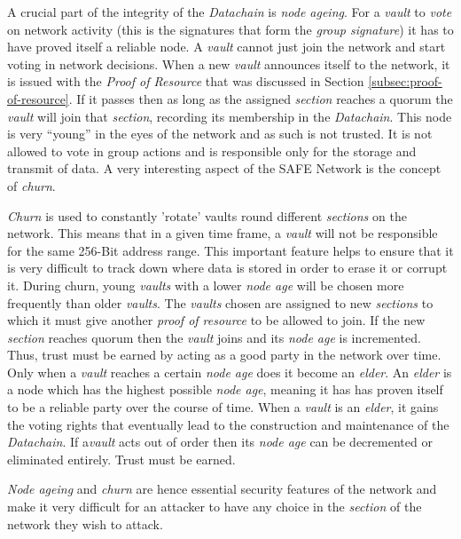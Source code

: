 A crucial part of the integrity of the \textit{Datachain} is \textit{node ageing}. For a \textit{vault} to \textit{vote} on network activity (this is the signatures that form the \textit{group signature}) it has to have proved itself a reliable node. A \textit{vault} cannot just join the network and start voting in network decisions. When a new \textit{vault} announces itself to the network, it is issued with the \textit{Proof of Resource} that was discussed in Section \ref{subsec:proof-of-resource}. If it passes then as long as the assigned \textit{section} reaches a quorum the \textit{vault} will join that \textit{section}, recording its membership in the \textit{Datachain}. This node is very ``young'' in the eyes of the network and as such is not trusted. It is not allowed to vote in group actions and is responsible only for the storage and transmit of data. A very interesting aspect of the SAFE Network is the concept of \textit{churn}. 

\textit{Churn} is used to constantly 'rotate' vaults round different \textit{sections} on the network. This means that in a given time frame, a \textit{vault} will not be responsible for the same 256-Bit address range. This important feature helps to ensure that it is very difficult to track down where data is stored in order to erase it or corrupt it. During churn, young \textit{vaults} with a lower \textit{node age} will be chosen more frequently than older \textit{vaults}. The \textit{vaults} chosen are assigned to new \textit{sections} to which it must give another \textit{proof of resource} to be allowed to join. If the new \textit{section} reaches quorum then the \textit{vault} joins and its \textit{node age} is incremented. Thus, trust must be earned by acting as a good party in the network over time. Only when a \textit{vault} reaches a certain \textit{node age} does it become an \textit{elder}. An \textit{elder} is a node which has the highest possible \textit{node age}, meaning it has has proven itself to be a reliable party over the course of time. When a \textit{vault} is an \textit{elder}, it gains the voting rights that eventually lead to the construction and maintenance of the \textit{Datachain}. If a\textit{vault} acts out of order then its \textit{node age} can be decremented or eliminated entirely. Trust must be earned.

\textit{Node ageing} and \textit{churn} are hence essential security features of the network and make it very difficult for an attacker to have any choice in the \textit{section} of the network they wish to attack.
